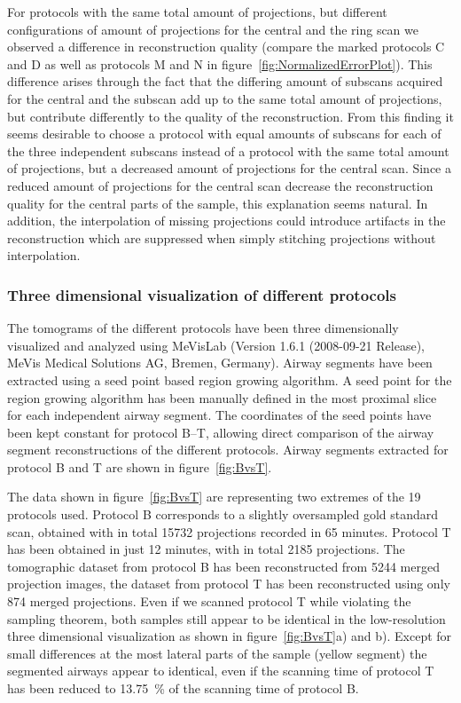 For protocols with the same total amount of projections, but different configurations of amount of projections for the central and the ring scan we observed a difference in reconstruction quality (compare the marked protocols C and D as well as protocols M and N in figure~\ref{fig:NormalizedErrorPlot}). This difference arises through the fact that the differing amount of subscans acquired for the central and the subscan add up to the same total amount of projections, but contribute differently to the quality of the reconstruction. From this finding it seems desirable to choose a protocol with equal amounts of subscans for each of the three independent subscans instead of a protocol with the same total amount of projections, but a decreased amount of projections for the central scan. Since a reduced amount of projections for the central scan decrease the reconstruction quality for the central parts of the sample, this explanation seems natural. In addition, the interpolation of missing projections could introduce artifacts in the reconstruction which are suppressed when simply stitching projections without interpolation.

\subsubsection{Three dimensional visualization of different protocols}%
\label{subsec:comparison}%
The tomograms of the different protocols have been three dimensionally visualized and analyzed using MeVisLab (Version 1.6.1 (2008-09-21 Release), MeVis Medical Solutions AG, Bremen, Germany). Airway segments have been extracted using a seed point based region growing algorithm. A seed point for the region growing algorithm has been manually defined in the most proximal slice for each independent airway segment. The coordinates of the seed points have been kept constant for protocol B--T, allowing direct comparison of the airway segment reconstructions of the different protocols. Airway segments extracted for protocol B and T are shown in figure~\ref{fig:BvsT}.

The data shown in figure~\ref{fig:BvsT} are representing two extremes of the 19 protocols used. Protocol B corresponds to a slightly oversampled gold standard scan, obtained with in total 15732 projections recorded in 65 minutes. Protocol T has been obtained in just 12 minutes, with in total 2185 projections. The tomographic dataset from protocol B has been reconstructed from 5244 merged projection images, the dataset from protocol T has been reconstructed using only 874 merged projections. Even if we scanned protocol T while violating the sampling theorem, both samples still appear to be identical in the low-resolution three dimensional visualization as shown in figure~\ref{fig:BvsT}a) and b). Except for small differences at the most lateral parts of the sample (yellow segment) the segmented airways appear to identical, even if the scanning time of protocol T has been reduced to \SI{13.75}{\percent} of the scanning time of protocol B.

